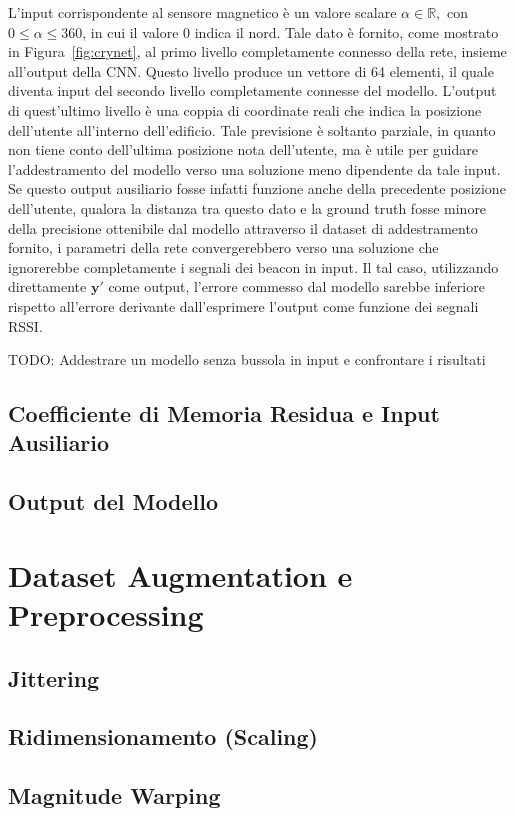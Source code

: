 L'input corrispondente al sensore magnetico è un valore scalare \(\alpha \in
  \mathbb{R}, \) con \(0 \leq \alpha \leq 360\), in cui il
valore \(0\) indica il nord. Tale dato è fornito, come mostrato in
Figura~\ref{fig:crynet}, al primo livello completamente connesso della rete,
insieme all'output della CNN\@.  Questo livello produce un vettore di 64
elementi, il quale diventa input del secondo livello completamente connesse del
modello. L'output di quest'ultimo livello è una coppia di coordinate reali che
indica la posizione dell'utente all'interno dell'edificio. Tale previsione è
soltanto parziale, in quanto non tiene conto dell'ultima posizione nota
dell'utente, ma è utile per guidare l'addestramento del modello verso una
soluzione meno dipendente da tale input. Se questo output ausiliario fosse
infatti funzione anche della precedente posizione dell'utente, qualora la
distanza tra questo dato e la ground truth fosse minore della precisione
ottenibile dal modello attraverso il dataset di addestramento fornito, i
parametri della rete convergerebbero verso una soluzione che ignorerebbe
completamente i segnali dei beacon in input. Il tal caso, utilizzando
direttamente \(\bm y'\) come output, l'errore commesso dal modello sarebbe
inferiore rispetto all'errore derivante dall'esprimere l'output come funzione
dei segnali RSSI\@.

{\large TODO\@: Addestrare un modello senza bussola in input e confrontare i risultati}
\subsection{Coefficiente di Memoria Residua e Input Ausiliario}
\subsection{Output del Modello}
\section{Dataset Augmentation e Preprocessing}
\subsection{Jittering}
\subsection{Ridimensionamento (Scaling)}
\subsection{Magnitude Warping}
